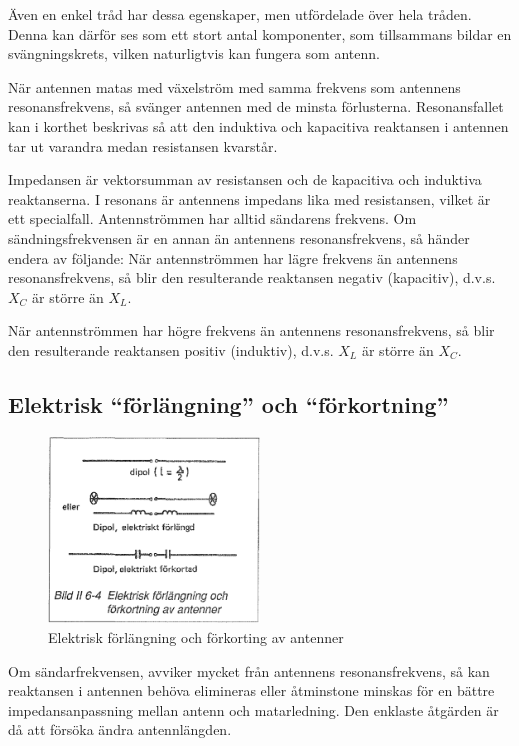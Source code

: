 Även en enkel tråd har dessa egenskaper, men utfördelade över hela
tråden. Denna kan därför ses som ett stort antal komponenter, som
tillsammans bildar en svängningskrets, vilken naturligtvis kan fungera
som antenn.

När antennen matas med växelström med samma frekvens som antennens
resonansfrekvens, så svänger antennen med de minsta
förlusterna. Resonansfallet kan i korthet beskrivas så att den
induktiva och kapacitiva reaktansen i antennen tar ut varandra medan
resistansen kvarstår.

Impedansen är vektorsumman av resistansen och de kapacitiva och
induktiva reaktanserna. I resonans är antennens impedans lika med
resistansen, vilket är ett specialfall. Antennströmmen har alltid
sändarens frekvens. Om sändningsfrekvensen är en annan än antennens
resonansfrekvens, så händer endera av följande: När antennströmmen har
lägre frekvens än antennens resonansfrekvens, så blir den resulterande
reaktansen negativ (kapacitiv), d.v.s. \(X_C\) är större än \(X_L\).

När antennströmmen har högre frekvens än antennens resonansfrekvens,
så blir den resulterande reaktansen positiv (induktiv), d.v.s. \(X_L\)
är större än \(X_C\).

\subsection{Elektrisk ``förlängning'' och ``förkortning''}

\begin{figure}
  \includegraphics[width=0.5\textwidth]{images/bild_2_6-04}
  \caption{Elektrisk förlängning och förkorting av antenner}
  \label{fig:bildII6-4}
\end{figure}

Om sändarfrekvensen, avviker mycket från antennens resonansfrekvens,
så kan reaktansen i antennen behöva elimineras eller åtminstone
minskas för en bättre impedansanpassning mellan antenn och
matarledning. Den enklaste åtgärden är då att försöka ändra
antennlängden.

